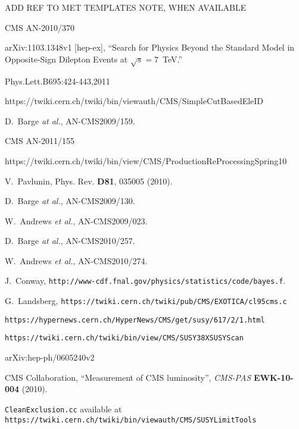 \begin{thebibliography}{10}

 ADD REF TO MET TEMPLATES NOTE, WHEN AVAILABLE

 CMS AN-2010/370

 arXiv:1103.1348v1 [hep-ex], ``Search for Physics Beyond the Standard Model in Opposite-Sign Dilepton Events at $\sqrt{s} = 7$~TeV.''

 Phys.Lett.B695:424-443,2011 

 https://twiki.cern.ch/twiki/bin/viewauth/CMS/SimpleCutBasedEleID

 D.~Barge {\em at al.}, AN-CMS2009/159.

 CMS AN-2011/155

 https://twiki.cern.ch/twiki/bin/view/CMS/ProductionReProcessingSpring10 

V.~Pavlunin, Phys. Rev. {\bf D81}, 035005 (2010).

  D.~Barge {\em at al.}, AN-CMS2009/130.

 W.~Andrews {\em et al.}, AN-CMS2009/023.

 D.~Barge {\em at al.}, AN-CMS2010/257.

W.~Andrews {\em et al.}, AN-CMS2010/274.

 J.~Conway, {\tt http://www-cdf.fnal.gov/physics/statistics/code/bayes.f}.

 G.~Landsberg, {\tt https://twiki.cern.ch/twiki/pub/CMS/EXOTICA/cl95cms.c}

 {\tt https://hypernews.cern.ch/HyperNews/CMS/get/susy/617/2/1.html}

 {\tt https://twiki.cern.ch/twiki/bin/view/CMS/SUSY38XSUSYScan}

 arXiv:hep-ph/0605240v2

{CMS Collaboration}, ``Measurement of CMS luminosity'', {\em CMS-PAS} {\bf
  EWK-10-004} (2010).

 {\tt CleanExclusion.cc} available at
{\tt https://twiki.cern.ch/twiki/bin/viewauth/CMS/SUSYLimitTools}


\end{thebibliography}
